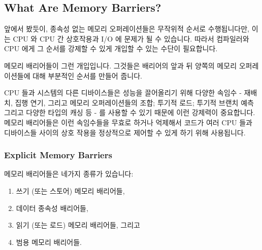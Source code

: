 \begin{enumerate}
\begin{enumerate}
\end{enumerate}

\subsection{What Are Memory Barriers?}
\label{sec:advsync:What Are Memory Barriers?}

앞에서 봤듯이, 종속성 없는 메모리 오퍼레이션들은 무작위적 순서로 수행됩니다만,
이는 CPU 와 CPU 간 상호작용과 I/O 에 문제가 될 수 있습니다.
따라서 컴파일러와 CPU 에게 그 순서를 강제할 수 있게 개입할 수 있는 수단이
필요합니다.

메모리 배리어들이 그런 개입입니다.
그것들은 배리어의 앞과 뒤 양쪽의 메모리 오퍼레이션들에 대해 부분적인 순서를
만들어 줍니다.

CPU 들과 시스템의 다른 디바이스들은 성능을 끌어올리기 위해 다양한 속임수 -
재배치, 집행 연기, 그리고 메모리 오퍼레이션들의 조합; 투기적 로드; 투기적
브랜치 예측 그리고 다양한 타입의 캐싱 등 - 를 사용할 수 있기 때문에 이런
강제력이 중요합니다.
메모리 배리어들은 이런 속임수들을 무효로 하거나 억제해서 코드가 여러 CPU 들과
디바이스들 사이의 상호 작용을 정상적으로 제어할 수 있게 하기 위해 사용됩니다.

\subsubsection{Explicit Memory Barriers}
\label{sec:advsync:Explicit Memory Barriers}

메모리 배리어들은 네가지 종류가 있습니다:

\begin{enumerate}
\item	쓰기 (또는 스토어) 메모리 배리어들,
\item	데이터 종속성 배리어들,
\item	읽기 (또는 로드) 메모리 배리어들, 그리고
\item	범용 메모리 배리어들.
\end{enumerate}


\end{enumerate}
